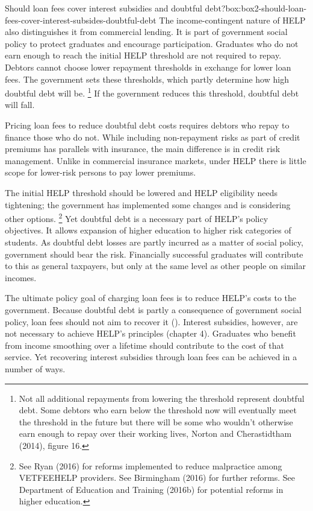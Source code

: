 \documentclass[embargoed]{grattan}
\begin{document}
\begin{bigbox*}{Should loan fees cover interest subsidies and doubtful debt?}{box:box2-should-loan-fees-cover-interest-subsides-doubtful-debt}
The income-contingent nature of \gls{HELP} also distinguishes it from commercial lending.
It is part of government social policy to protect graduates and encourage participation.
Graduates who do not earn enough to reach the initial \gls{HELP} threshold are not required to repay.
Debtors cannot choose lower repayment thresholds in exchange for lower loan fees.
The government sets these thresholds, which partly determine how high doubtful debt will be.%
\footnote{Not all additional repayments from lowering the threshold represent doubtful debt.
Some debtors who earn below the threshold now will eventually meet the threshold in the future but there will be some who wouldn't otherwise earn enough to repay over their working lives, Norton and Cherastidtham (2014), figure 16.} If the government reduces this threshold, doubtful debt will fall.

Pricing loan fees to reduce doubtful debt costs requires debtors who repay to finance those who do not.
While including non-repayment risks as part of credit premiums has parallels with insurance, the main difference is in credit risk management.
Unlike in commercial insurance markets, under \gls{HELP} there is little scope for lower-risk persons to pay lower premiums.

The initial \gls{HELP} threshold should be lowered and \gls{HELP} eligibility needs tightening; the government has implemented some changes and is considering other options.%
\footnote{See Ryan (2016) for reforms implemented to reduce malpractice among \gls{VETFEEHELP} providers.
See Birmingham (2016) for further reforms.
See Department of Education and Training (2016b) for potential reforms in higher education.} Yet doubtful debt is a necessary part of \gls{HELP}'s policy objectives.
It allows expansion of higher education to higher risk categories of students.
As doubtful debt losses are partly incurred as a matter of social policy, government should bear the risk.
Financially successful graduates will contribute to this as general taxpayers, but only at the same level as other people on similar incomes.
\end{bigbox*}

The ultimate policy goal of charging loan fees is to reduce \gls{HELP}'s costs to the government.
Because doubtful debt is partly a consequence of government social policy, loan fees should not aim to recover it ().
Interest subsidies, however, are not necessary to achieve \gls{HELP}'s principles (chapter 4).
Graduates who benefit from income smoothing over a lifetime should contribute to the cost of that service.
Yet recovering interest subsidies through loan fees can be achieved in a number of ways.
\end{document}
